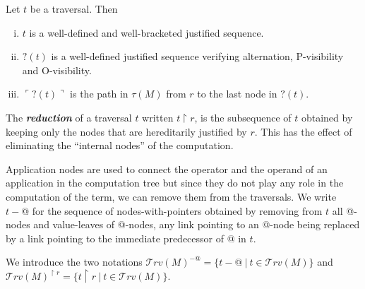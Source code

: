 \documentclass{llncs}
\newcommand\defname[1]{{\bf\em #1}\index{#1}}
\newcommand\travset{\mathcal{T}rv}
\newcommand{\pview}[1]{\ulcorner #1 \urcorner}
\begin{document}
\begin{proposition}
\label{prop:pviewtrav_is_path}
Let $t$ be a traversal. Then
\begin{enumerate}[(i)]
\item $t$ is a well-defined and well-bracketed justified sequence.
\item $?(t)$ is a well-defined justified sequence verifying alternation, P-visibility and O-visibility.
\item $\pview{?(t)}$ is the path in $\tau(M)$ from $r$ to the last node in $?(t)$.
\end{enumerate}
\end{proposition}

The \defname{reduction} of a traversal $t$ written $ t \upharpoonright
r$, is the subsequence of $t$ obtained by keeping only the nodes that
are hereditarily justified by $r$. This has the effect of eliminating
the ``internal nodes'' of the computation.

Application nodes are used to connect the operator and the operand of
an application in the computation tree but since they do not play any
role in the computation of the term, we can remove them from the
traversals.  We write $t-@$ for the sequence of nodes-with-pointers
obtained by removing from $t$ all @-nodes and value-leaves of @-nodes,
any link pointing to an @-node being replaced by a link pointing to
the immediate predecessor of @ in $t$.

We introduce the two notations $\travset(M)^{-@} = \{ t - @ \ | \  t \in \travset(M) \}$ and $\travset(M)^{\upharpoonright r} = \{ t  \upharpoonright r \ | \  t  \in \travset(M) \}$.
\end{document}
